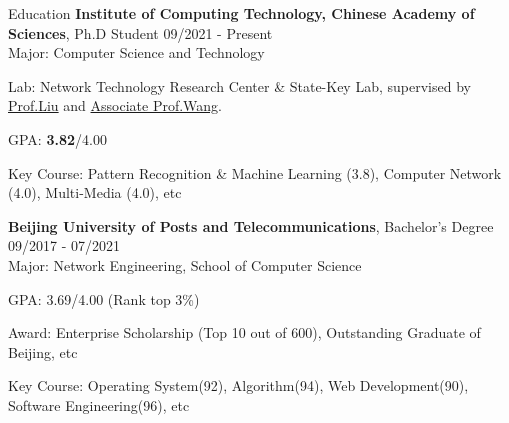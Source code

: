 \documentclass{resume} %
\begin{document}
\begin{CJK}{UTF8}{gbsn}


\begin{rSection}{Education}
{\bf Institute of Computing Technology, Chinese Academy of Sciences}, Ph.D Student  \hfill {09/2021 - Present}\\
Major: Computer Science and Technology

Lab: Network Technology Research Center \& State-Key Lab, supervised by \href{http://www.ict.cas.cn/sourcedb_2018_ict_cas/cn/jssrck/200909/t20090917_2496676.html}{Prof.Liu} and \href{http://www.ict.cas.cn/sourcedb_2018_ict_cas/cn/jssrck/201612/t20161205_4716449.html}{Associate Prof.Wang}.

GPA: \textbf{3.82}/4.00

Key Course: Pattern Recognition \& Machine Learning (3.8), Computer Network (4.0), Multi-Media (4.0), etc

{\bf Beijing University of Posts and Telecommunications}, Bachelor's Degree  \hfill {09/2017 - 07/2021}\\
Major: Network Engineering, School of Computer Science

GPA: 3.69/4.00 (Rank top 3\%)

Award: Enterprise Scholarship (Top 10 out of 600), Outstanding Graduate of Beijing, etc

Key Course: Operating System(92), Algorithm(94), Web Development(90), Software Engineering(96), etc



\end{rSection}





\end{CJK}
\end{document}
